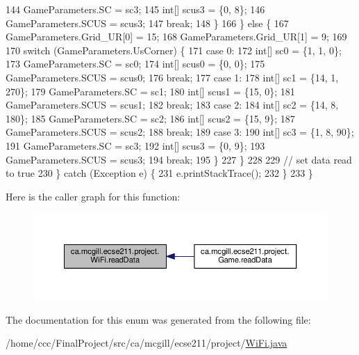 \begin{DoxyCode}
144             GameParameters.SC = sc3;
145             \textcolor{keywordtype}{int}[] scus3 = \{0, 8\};
146             GameParameters.SCUS = scus3;
147             \textcolor{keywordflow}{break};
148         \}
166       \} \textcolor{keywordflow}{else} \{
167         GameParameters.Grid\_UR[0] = 15;
168         GameParameters.Grid\_UR[1] = 9;
169 
170         \textcolor{keywordflow}{switch} (GameParameters.UsCorner) \{
171           \textcolor{keywordflow}{case} 0:
172             \textcolor{keywordtype}{int}[] sc0 = \{1, 1, 0\};
173             GameParameters.SC = sc0;
174             \textcolor{keywordtype}{int}[] scus0 = \{0, 0\};
175             GameParameters.SCUS = scus0;
176             \textcolor{keywordflow}{break};
177           \textcolor{keywordflow}{case} 1:
178             \textcolor{keywordtype}{int}[] sc1 = \{14, 1, 270\};
179             GameParameters.SC = sc1;
180             \textcolor{keywordtype}{int}[] scus1 = \{15, 0\};
181             GameParameters.SCUS = scus1;
182             \textcolor{keywordflow}{break};
183           \textcolor{keywordflow}{case} 2:
184             \textcolor{keywordtype}{int}[] sc2 = \{14, 8, 180\};
185             GameParameters.SC = sc2;
186             \textcolor{keywordtype}{int}[] scus2 = \{15, 9\};
187             GameParameters.SCUS = scus2;
188             \textcolor{keywordflow}{break};
189           \textcolor{keywordflow}{case} 3:
190             \textcolor{keywordtype}{int}[] sc3 = \{1, 8, 90\};
191             GameParameters.SC = sc3;
192             \textcolor{keywordtype}{int}[] scus3 = \{0, 9\};
193             GameParameters.SCUS = scus3;
194             \textcolor{keywordflow}{break};
195         \}
227       \}
228 
229       \textcolor{comment}{// set data read to true}
230     \} \textcolor{keywordflow}{catch} (Exception e) \{
231       e.printStackTrace();
232     \}
233   \}
\end{DoxyCode}
Here is the caller graph for this function\+:\nopagebreak
\begin{figure}[H]
\begin{center}
\leavevmode
\includegraphics[width=350pt]{enumca_1_1mcgill_1_1ecse211_1_1project_1_1_wi_fi_a3488726983cda70dbde6f05c9c762f16_icgraph}
\end{center}
\end{figure}


The documentation for this enum was generated from the following file\+:\begin{DoxyCompactItemize}
\item 
/home/ccc/\+Final\+Project/src/ca/mcgill/ecse211/project/\hyperlink{_wi_fi_8java}{Wi\+Fi.\+java}\end{DoxyCompactItemize}
